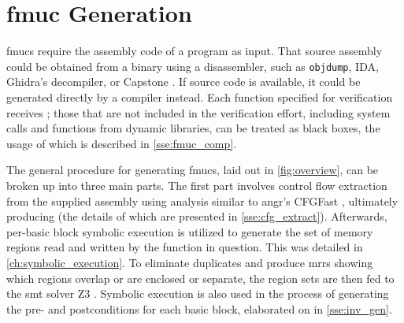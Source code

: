 \section{\acs*{fmuc} Generation}\label{se:fmuc_gen}
\begin{figure*}
  \centering
  \caption{Overview of \acs*{fmuc} generation}\label{fig:overview}
\end{figure*}

\Acp{fmuc} require the assembly code of a program as input.
That source assembly could be obtained from a binary using a disassembler, such as \texttt{objdump},
IDA,
Ghidra's decompiler, or Capstone \autocite{capstone}.
If source code is available, it could be generated directly by a compiler instead.
Each function specified for verification receives ;
those that are not included in the verification effort,%
including system calls and functions from dynamic libraries,
can be treated as black boxes,
the usage of which is described in \cref{sse:fmuc_comp}.

The general procedure for generating \acp{fmuc}, laid out in \cref{fig:overview},
can be broken up into three main parts.
The first part involves control flow extraction from the supplied assembly
using  analysis similar to angr's CFGFast%
\autocite{shoshitaishvili2016state},
ultimately producing  (the details of which are presented
in \cref{sse:cfg_extract}).
Afterwards, per-basic block symbolic execution
is utilized to generate the set of memory regions
read and written by the function in question.
This was detailed in \cref{ch:symbolic_execution}.
To eliminate duplicates and produce \acp{mrr}
showing which regions overlap or are enclosed or separate,
the region sets are then fed to the \ac{smt} solver Z3 \autocite{de2008z3}.
Symbolic execution is also used in the process of generating
the pre- and postconditions for each basic block,
elaborated on in \cref{sse:inv_gen}.

